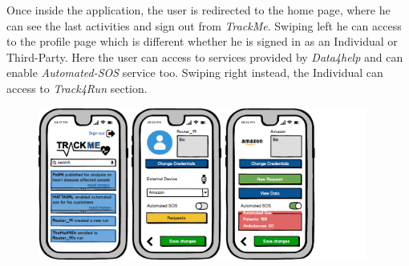 \documentclass[a4paper]{article}
\begin{document}
Once inside the application, the user is redirected to the home page, where he can see the last activities and sign out from \textit{TrackMe}. Swiping left he can access to the profile page which is different whether he is signed in as an Individual or Third-Party. Here the user can access to services provided by \textit{Data4help} and can enable \textit{Automated-SOS} service too. Swiping right instead, the Individual can access to \textit{Track4Run} section.

\begin{figure}[!htpb]
    	\centering
    	\includegraphics[height=50mm]{images/mockups/HomePage.png}
    	\includegraphics[height=50mm]{images/mockups/IndividualProfile.png}
    	\includegraphics[height=50mm]{images/mockups/ThirdPartyProfile.png}
        \end{figure}
\end{document}
